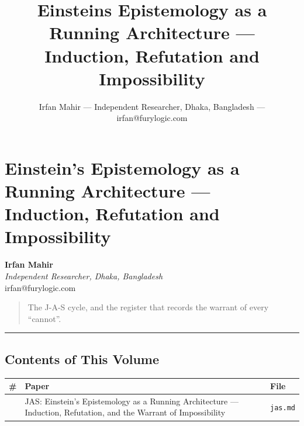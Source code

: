 \documentclass[
  11pt,
  a4paper,
]{article}
\title{Einstein\textquotesingle s Epistemology as a Running Architecture
--- Induction, Refutation and Impossibility}
\author{Irfan Mahir --- Independent Researcher, Dhaka, Bangladesh ---
irfan@furylogic.com}
\date{}
\begin{document}
\maketitle

{
\hypersetup{linkcolor=}
\setcounter{tocdepth}{2}
\tableofcontents
}
\section{Einstein's Epistemology as a Running Architecture ---
Induction, Refutation and
Impossibility}\label{einsteins-epistemology-as-a-running-architecture-induction-refutation-and-impossibility}

\textbf{Irfan Mahir}\\
\emph{Independent Researcher, Dhaka, Bangladesh}\\
irfan@furylogic.com

\begin{quote}
The J-A-S cycle, and the register that records the warrant of every
``cannot''.
\end{quote}

\begin{center}\rule{0.5\linewidth}{0.5pt}\end{center}

\subsection{Contents of This Volume}\label{contents-of-this-volume}

\begin{longtable}[]{@{}
  >{\raggedright\arraybackslash}p{}
  >{\raggedright\arraybackslash}p{}
  >{\raggedright\arraybackslash}p{}@{}}
\toprule\noalign{}
\begin{minipage}[b]{\linewidth}\raggedright
\#
\end{minipage} & \begin{minipage}[b]{\linewidth}\raggedright
Paper
\end{minipage} & \begin{minipage}[b]{\linewidth}\raggedright
File
\end{minipage} \\
\midrule\noalign{}
\endhead
\bottomrule\noalign{}
\endlastfoot
1 & JAS: Einstein's Epistemology as a Running Architecture ---
Induction, Refutation, and the Warrant of Impossibility &
\texttt{jas.md} \\
\end{longtable}
\end{document}
